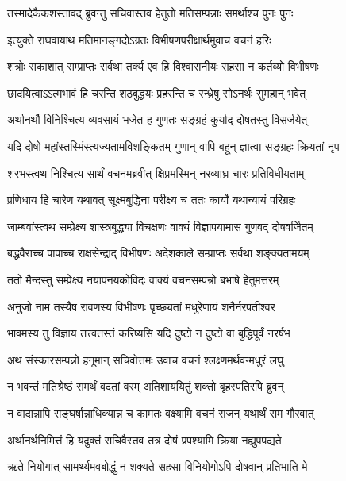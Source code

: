 \twolineshloka
{तस्मादेकैकशस्तावद् ब्रुवन्तु सचिवास्तव}
{हेतुतो मतिसम्पन्नाः समर्थाश्च पुनः पुनः} %

\twolineshloka
{इत्युक्ते राघवायाथ मतिमानङ्गदोऽग्रतः}
{विभीषणपरीक्षार्थमुवाच वचनं हरिः} %

\twolineshloka
{शत्रोः सकाशात् सम्प्राप्तः सर्वथा तर्क्य एव हि}
{विश्वासनीयः सहसा न कर्तव्यो विभीषणः} %

\twolineshloka
{छादयित्वाऽऽत्मभावं हि चरन्ति शठबुद्धयः}
{प्रहरन्ति च रन्ध्रेषु सोऽनर्थः सुमहान् भवेत्} %

\twolineshloka
{अर्थानर्थौ विनिश्चित्य व्यवसायं भजेत ह}
{गुणतः सङ्ग्रहं कुर्याद् दोषतस्तु विसर्जयेत्} %

\twolineshloka
{यदि दोषो महांस्तस्मिंस्त्यज्यतामविशङ्कितम्}
{गुणान् वापि बहून् ज्ञात्वा सङ्ग्रहः क्रियतां नृप} %

\twolineshloka
{शरभस्त्वथ निश्चित्य सार्थं वचनमब्रवीत्}
{क्षिप्रमस्मिन् नरव्याघ्र चारः प्रतिविधीयताम्} %

\twolineshloka
{प्रणिधाय हि चारेण यथावत् सूक्ष्मबुद्धिना}
{परीक्ष्य च ततः कार्यो यथान्यायं परिग्रहः} %

\twolineshloka
{जाम्बवांस्त्वथ सम्प्रेक्ष्य शास्त्रबुद्ध्या विचक्षणः}
{वाक्यं विज्ञापयामास गुणवद् दोषवर्जितम्} %

\twolineshloka
{बद्धवैराच्च पापाच्च राक्षसेन्द्राद् विभीषणः}
{अदेशकाले सम्प्राप्तः सर्वथा शङ्क्यतामयम्} %

\twolineshloka
{ततो मैन्दस्तु सम्प्रेक्ष्य नयापनयकोविदः}
{वाक्यं वचनसम्पन्नो बभाषे हेतुमत्तरम्} %

\twolineshloka
{अनुजो नाम तस्यैष रावणस्य विभीषणः}
{पृच्छ्यतां मधुरेणायं शनैर्नरपतीश्वर} %

\twolineshloka
{भावमस्य तु विज्ञाय तत्त्वतस्तं करिष्यसि}
{यदि दुष्टो न दुष्टो वा बुद्धिपूर्वं नरर्षभ} %

\twolineshloka
{अथ संस्कारसम्पन्नो हनूमान् सचिवोत्तमः}
{उवाच वचनं श्लक्ष्णमर्थवन्मधुरं लघु} %

\twolineshloka
{न भवन्तं मतिश्रेष्ठं समर्थं वदतां वरम्}
{अतिशाययितुं शक्तो बृहस्पतिरपि ब्रुवन्} %

\twolineshloka
{न वादान्नापि सङ्घर्षान्नाधिक्यान्न च कामतः}
{वक्ष्यामि वचनं राजन् यथार्थं राम गौरवात्} %

\twolineshloka
{अर्थानर्थनिमित्तं हि यदुक्तं सचिवैस्तव}
{तत्र दोषं प्रपश्यामि क्रिया नह्युपपद्यते} %

\twolineshloka
{ऋते नियोगात् सामर्थ्यमवबोद्धुं न शक्यते}
{सहसा विनियोगोऽपि दोषवान् प्रतिभाति मे} %

